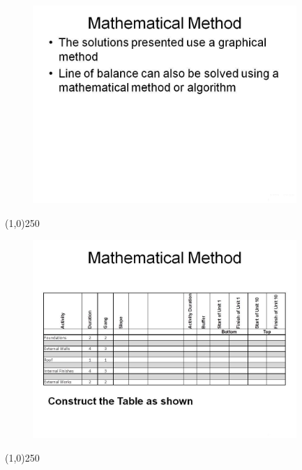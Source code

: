 \begin{frame}
\begin{figure}
	\centering
		\includegraphics[width = 10.0cm]{oldnotes/Slide270.jpg}
\end{figure}
\end{frame}
\begin{center}\line(1,0){250}\end{center}






\begin{frame}
\begin{figure}
	\centering
		\includegraphics[width = 10.0cm]{oldnotes/Slide271.jpg}
\end{figure}
\end{frame}
\begin{center}\line(1,0){250}\end{center}






